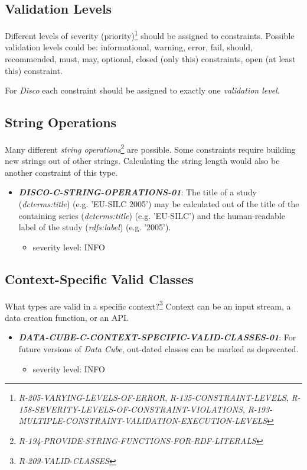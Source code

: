 \documentclass{llncs}
\begin{document}
\subsection{Validation Levels}

Different levels of severity (priority)\footnote{\emph{R-205-VARYING-LEVELS-OF-ERROR}, \emph{R-135-CONSTRAINT-LEVELS}, \emph{R-158-SEVERITY-LEVELS-OF-CONSTRAINT-VIOLATIONS}, \emph{R-193-MULTIPLE-CONSTRAINT-VALIDATION-EXECUTION-LEVELS}} should be assigned to constraints.
Possible validation levels could be: informational, warning, error, fail, should, recommended, must, may, optional, closed (only this) constraints, open (at least this) constraint.

For \emph{Disco} each constraint should be assigned to exactly one \emph{validation level}.

\subsection{String Operations}

Many different \emph{string operations}\footnote{\emph{R-194-PROVIDE-STRING-FUNCTIONS-FOR-RDF-LITERALS}} are possible.
Some constraints require building new strings out of other strings.
Calculating the string length would also be another constraint of this type.

\begin{itemize}
	\item \textbf{{\em DISCO-C-STRING-OPERATIONS-01}}: The title of a study (\emph{dcterms:title}) (e.g. 'EU-SILC 2005') may be calculated out of the title of the containing series (\emph{dcterms:title}) (e.g. 'EU-SILC') and the human-readable label of the study (\emph{rdfs:label}) (e.g. '2005').   
	\begin{itemize}
		\item severity level: INFO
	\end{itemize}
\end{itemize}

\subsection{Context-Specific Valid Classes}

What types are valid in a specific context?\footnote{\emph{R-209-VALID-CLASSES}} 
Context can be an input stream, a data creation function, or an API.

\begin{itemize}
	\item \textbf{{\em DATA-CUBE-C-CONTEXT-SPECIFIC-VALID-CLASSES-01}}: For future versions of \emph{Data Cube}, out-dated classes can be marked as deprecated.
	\begin{itemize}
		\item severity level: INFO
	\end{itemize}
\end{itemize}
\end{document}
